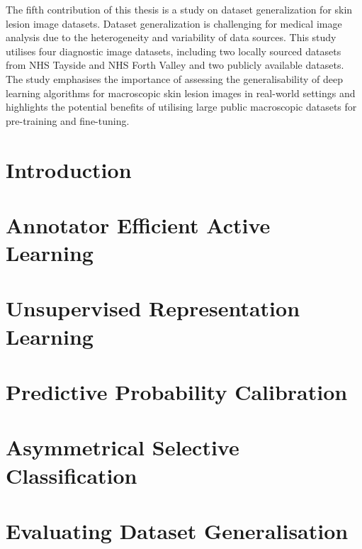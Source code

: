 \documentclass[12pt]{report}
\begin{document}
	The fifth contribution of this thesis is a study on dataset generalization for skin lesion image datasets. Dataset generalization is challenging for medical image analysis due to the heterogeneity and variability of data sources. This study utilises four diagnostic image datasets, including two locally sourced datasets from NHS Tayside and NHS Forth Valley and two publicly available datasets. The study emphasises the importance of assessing the generalisability of deep learning algorithms for macroscopic skin lesion images in real-world settings and highlights the potential benefits of utilising large public macroscopic datasets for pre-training and fine-tuning.
	
	
	
	\newpage
	\chapter{Introduction}
	\label{ch:introduction}
	
	
	
	\chapter{Annotator Efficient Active Learning}
	\label{ch:active_learning}
	
	
	
	\chapter{Unsupervised Representation Learning}
	\label{ch:unsupervised_representation_learning}
	
	
	
	\chapter{Predictive Probability Calibration}
	\label{ch:classification_claibration}
	
	
	
	\chapter{Asymmetrical Selective Classification}
	\label{ch:selective_classification}
	
	
	
	\chapter{Evaluating Dataset Generalisation}
	\label{ch:dataset_generalisation}
	
	
\end{document}
